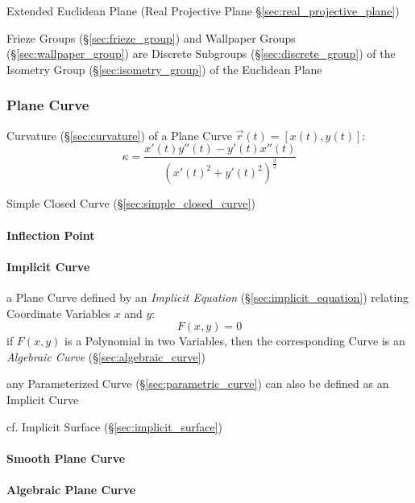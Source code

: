 \fist Extended Euclidean Plane (Real Projective Plane
\S\ref{sec:real_projective_plane})

Frieze Groups (\S\ref{sec:frieze_group}) and Wallpaper Groups
(\S\ref{sec:wallpaper_group}) are Discrete Subgroups
(\S\ref{sec:discrete_group}) of the Isometry Group (\S\ref{sec:isometry_group})
of the Euclidean Plane



\subsubsection{Plane Curve}\label{sec:plane_curve}

Curvature (\S\ref{sec:curvature}) of a Plane Curve $\vec{r}(t) = [x(t),y(t)]$:
\[
  \kappa = \frac{x'(t)y''(t) - y'(t)x''(t)} {(x'(t)^2 + y'(t)^2)^{\frac{3}{2}}}
\]

\fist Simple Closed Curve (\S\ref{sec:simple_closed_curve})



\paragraph{Inflection Point}\label{sec:inflection_point}\hfill

\paragraph{Implicit Curve}\label{sec:implicit_curve}\hfill

a Plane Curve defined by an \emph{Implicit Equation}
(\S\ref{sec:implicit_equation}) relating Coordinate Variables $x$ and $y$:
\[
  F(x,y) = 0
\]
if $F(x,y)$ is a Polynomial in two Variables, then the corresponding Curve is an
\emph{Algebraic Curve} (\S\ref{sec:algebraic_curve})

any Parameterized Curve (\S\ref{sec:parametric_curve}) can also be defined as an
Implicit Curve

\fist cf. Implicit Surface (\S\ref{sec:implicit_surface})



\paragraph{Smooth Plane Curve}\label{sec:smooth_plane_curve}\hfill

\paragraph{Algebraic Plane Curve}\label{sec:algebraic_plane_curve}\hfill

